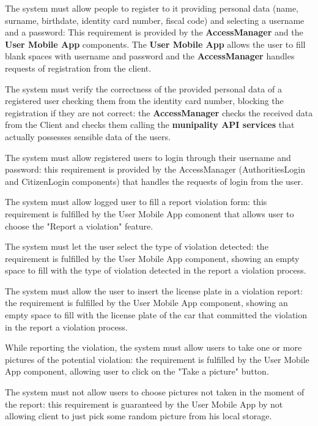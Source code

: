 \documentclass[a4paper]{report}
\begin{document}
\begin{enumerate}[start=1,label={[R\arabic*]}]
\item The system must allow people to register to it providing personal data (name, surname, birthdate, identity card number, fiscal code) and selecting a username and a password: This requirement is provided by the \textbf{AccessManager} and the \textbf{User Mobile App} components. The \textbf{User Mobile App} allows the user to fill blank spaces with username and password and the \textbf{AccessManager} handles requests of registration from the client.
\item The system must verify the correctness of the provided personal data of a registered user checking them from the identity card number, blocking the registration if they are not correct: the \textbf{AccessManager} checks the received data from the Client and checks them calling the \textbf{munipality API services} that actually possesses sensible data of the users. 
\item The system must allow registered users to login through their username and password: this requirement is provided by the AccessManager (AuthoritiesLogin and CitizenLogin components) that handles the requests of login from the user. 
\item The system must allow logged user to fill a report violation form: this requirement is fulfilled by the User Mobile App comonent that allows user to choose the "Report a violation" feature.
\item The system must let the user select the type of violation detected: the requirement is fulfilled by the User Mobile App component, showing an empty space to fill with the type of violation detected in the report a violation process.
\item The system must allow the user to insert the license plate in a violation report:  the requirement is fulfilled by the User Mobile App component, showing an empty space to fill with the license plate of the car that committed the violation in the report a violation process.
\item While reporting the violation, the system must allow users to take one or more pictures of the potential violation: the requirement is fulfilled by the User Mobile App component, allowing user to click on the "Take a picture" button.
\item The system must not allow users to choose pictures not taken in the moment of the report: this requirement is guaranteed by the User Mobile App by not allowing client to just pick some random picture from his local storage.

\end{enumerate}
\end{document}
